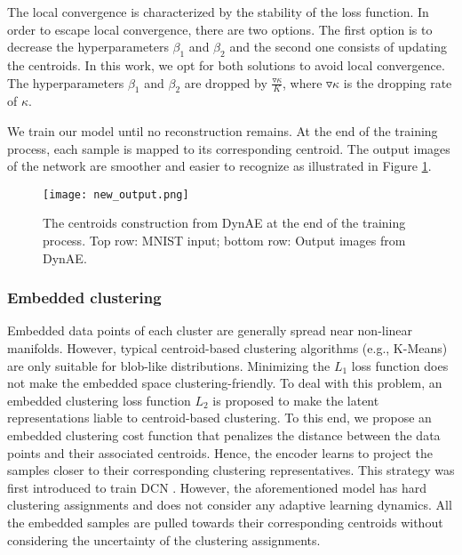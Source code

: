 \documentclass{article}
\begin{document}
The local convergence is characterized by the stability of the loss function. In order to escape local convergence, there are two options. The first option is to decrease the hyperparameters $\beta_{1}$ and $\beta_{2}$ and the second one consists of updating the centroids. In this work, we opt for both solutions to avoid local convergence. The hyperparameters $\beta_{1}$ and $\beta_{2}$ are dropped by $\frac{\triangledown\kappa}{K}$, where $\triangledown\kappa$ is the dropping rate of $\kappa$.

We train our model until no reconstruction remains. At the end of the training process, each sample is mapped to its corresponding centroid. The output images of the network are smoother and easier to recognize as illustrated in Figure \ref{fig:new_output}.

\begin{figure}[ht]
\vskip 0.2in
\begin{center}
\centerline{\texttt{[image: new\_output.png]}}
\caption{The centroids construction from DynAE at the end of the training process. Top row: MNIST input; bottom row: Output images from DynAE.}
\label{fig:new_output}
\end{center}
\vskip -0.2in
\end{figure}

\subsubsection{Embedded clustering}

Embedded data points of each cluster are generally spread near non-linear manifolds. However, typical centroid-based clustering algorithms (e.g., K-Means) are only suitable for blob-like distributions. Minimizing the $L_{1}$ loss function does not make the embedded space clustering-friendly. To deal with this problem, an embedded clustering loss function $L_{2}$ is proposed to make the latent representations liable to centroid-based clustering. To this end, we propose an embedded clustering cost function that penalizes the distance between the data points and their associated centroids. Hence, the encoder learns to project the samples closer to their corresponding clustering representatives. This strategy was first introduced to train DCN \cite{paper29}. However, the aforementioned model has hard clustering assignments and does not consider any adaptive learning dynamics. All the embedded samples are pulled towards their corresponding centroids without considering the uncertainty of the clustering assignments. 
\end{document}
